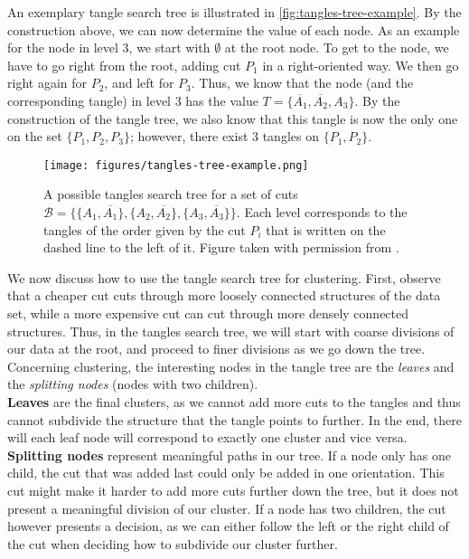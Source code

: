An exemplary tangle search tree is illustrated in \autoref{fig:tangles-tree-example}. 
By the construction above, we can now determine the value of each node. 
As an example for the node in level 3, we start with $\emptyset$ at the root node. To
get to the node, we have to go right from the root, adding cut $P_1$ in a right-oriented
way. We then go right again for $P_2$, and left for $P_3$. Thus, we know that the node (and the 
corresponding tangle) in level 3 has the value $T = \{\overline{A_1}, \overline{A_2}, A_3\}$. 
By the construction of the tangle tree, we also know that this tangle is now the only one on
the set $\{P_1, P_2, P_3\}$; however, there exist 3 tangles on $\{P_1, P_2\}$.


\begin{figure}[h]
    \centering
    \texttt{[image: figures/tangles-tree-example.png]}
    \caption{A possible tangles search tree for a set of cuts $\mathcal{B} = \{\{A_1, \overline{A_1}\}, \{A_2, \overline{A_2}\}, \{A_3, \overline{A_3}\} \}$. 
        Each level corresponds to the tangles of the order given by the cut $P_i$ that is written on the dashed line to the left of it.
        Figure taken with permission from \cite{klepperClusteringTanglesAlgorithmic2021}.}
    \label{fig:tangles-tree-example}
\end{figure}

We now discuss how to use the tangle search tree for clustering. 
First, observe that a cheaper cut cuts through more loosely connected structures
of the data set, while a more expensive cut can cut through more densely connected structures.
Thus, in the tangles search tree, we will start with coarse divisions of our data
at the root, and proceed to finer divisions as we go down the tree. Concerning clustering, the interesting nodes in the tangle tree are the \textit{leaves} and
the \textit{splitting nodes} (nodes with two children). \\
\textbf{Leaves} are the final clusters, as we cannot add more cuts to the tangles and thus cannot subdivide the structure that the tangle points to further. In the end, 
there will each leaf node will correspond to exactly one cluster and vice versa.\\
\textbf{Splitting nodes} represent meaningful paths in our tree. If a node only has one child,
the cut that was added last could only be added in one orientation. This cut might make it harder to add more cuts further down the tree, but it does not present
a meaningful division of our cluster. If a node has two children, 
the cut however presents a decision, as we can either follow the left or the right
child of the cut when deciding how to subdivide our cluster further. 


